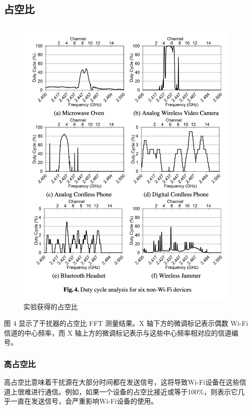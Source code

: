 \subsection{占空比}

\begin{figure}[h]
    \centering
    \includegraphics[width=15cm]{res/wifi2.png}
    \caption{实验获得的占空比}
\end{figure}

图 4 显示了干扰器的占空比 FFT 测量结果。X 轴下方的微调标记表示偶数 Wi-Fi 信道的中心频率，而 X 轴上方的微调标记表示与这些中心频率相对应的信道编号。

\subsubsection{高占空比}

高占空比意味着干扰源在大部分时间都在发送信号，这将导致Wi-Fi设备在这些信道上很难进行通信。例如，如果一个设备的占空比接近或等于100\%，则表示它几乎一直在发送信号，会严重影响Wi-Fi设备的使用。

